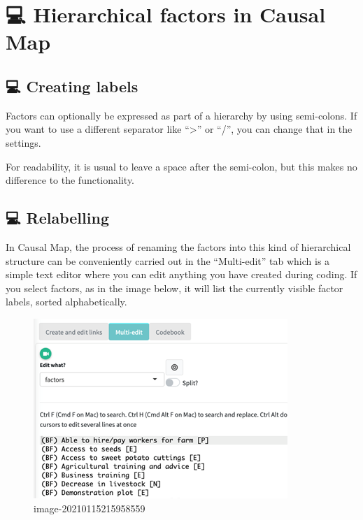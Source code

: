 \documentclass[
]{book}
\begin{document}
\hypertarget{hierarchical-factors-in-causal-map}{%
\chapter{💻 Hierarchical factors in Causal Map}\label{hierarchical-factors-in-causal-map}}

\hypertarget{creating-labels}{%
\section{💻 Creating labels}\label{creating-labels}}

Factors can optionally be expressed as part of a hierarchy by using semi-colons. If you want to use a different separator like ``\textgreater{}'' or ``/'', you can change that in the settings.

For readability, it is usual to leave a space after the semi-colon, but this makes no difference to the functionality.

\hypertarget{relabelling}{%
\section{💻 Relabelling}\label{relabelling}}

In Causal Map, the process of renaming the factors into this kind of hierarchical structure can be conveniently carried out in the ``Multi-edit'' tab which is a simple text editor where you can edit anything you have created during coding. If you select factors, as in the image below, it will list the currently visible factor labels, sorted alphabetically.

\begin{figure}
\centering
\includegraphics{_assets/image-20210115215958559.png}
\caption{image-20210115215958559}
\end{figure}
\end{document}
